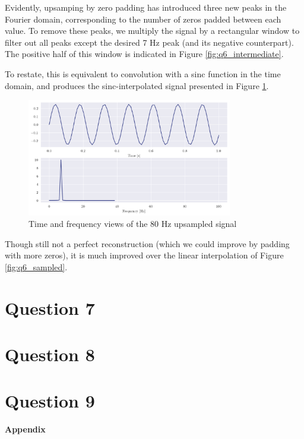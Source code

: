 \documentclass[a4paper, 11pt]{article}
\begin{document}
Evidently, upsamping by zero padding has introduced three new peaks in the
Fourier domain, corresponding to the number of zeros padded between each value.
To remove these peaks, we multiply the signal by a rectangular window to filter
out all peaks except the desired 7 Hz peak (and its negative counterpart). The
positive half of this window is indicated in Figure \ref{fig:q6_intermediate}.

To restate, this is equivalent to convolution with a sinc function in the time
domain, and produces the sinc-interpolated signal presented in Figure
\ref{fig:q6_upsampled}.

\begin{figure}[ht]
    \centering
    \includegraphics[width=0.8\textwidth]{images/q6_upsampled.png}
    \caption{Time and frequency views of the 80 Hz upsampled signal}
    \label{fig:q6_upsampled}
\end{figure}

Though still not a perfect reconstruction (which we could improve by padding with more
zeros), it is much improved over the linear interpolation of Figure
\ref{fig:q6_sampled}.

\newpage
\section*{Question 7}
\section*{Question 8}
\section*{Question 9}

\newpage
\appendix
\begin{center}
    \LARGE{\textbf{Appendix}}
\end{center}
\end{document}
